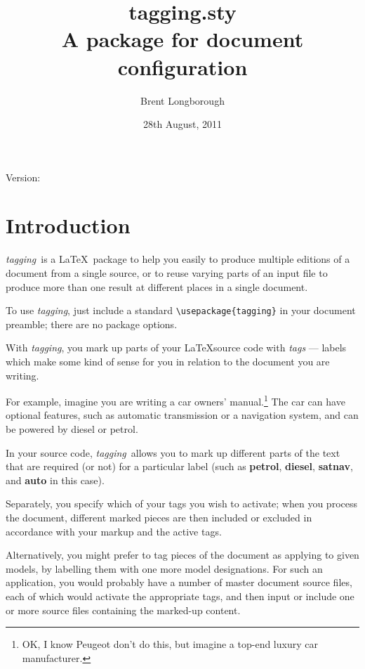\documentclass[a4paper,12pt,twoside,openany]{memoir}
\newcommand{\tpfname}{\textsf{tagging.sty}}
\newcommand{\tpname}{\textsf{\itshape tagging}}
\newcommand{\gitVtagn}{\space1.0}
\begin{document}
\title{%
	\Huge \tpfname\\[2ex]%
	\Large A package for document configuration
	}
\author{Brent Longborough}
\date{28th August, 2011}
\maketitle

{\centering
Version:\gitVtagn\\
}
\begingroup
{}
\setlength{\afterchapskip}{20pt}
\let\clearpage\relax
\let\chaptitlefont\Large\bfseries
\vspace*{5\baselineskip}
\tableofcontents*
\clearpage
\endgroup
\chapter{Introduction}
\tpname\ is a \LaTeX\ package to help you easily to
produce multiple editions of a document from a single source,
or to reuse varying parts of an input file
to produce more than one result at different places
in a single document.

To use \tpname, just include a standard \verb!\usepackage{tagging}!
in your document preamble; there are no package options.

With \tpname, you mark up parts of your
\LaTeX source code with \textit{tags} --- labels which
make some kind of sense for you in relation to
the document you are writing.

For example, imagine you are writing a car owners' manual.\footnote{%
OK, I know Peugeot don't do this,
but imagine a top-end luxury car manufacturer.}
The car can have optional features, such as automatic transmission
or a navigation system, and can be powered by diesel or petrol.

In your source code, \tpname\ allows you to
mark up different parts of the text that
are required (or not) for a particular label
(such as \textbf{petrol}, \textbf{diesel}, \textbf{satnav},
and \textbf{auto} in this case).

Separately, you specify which of your tags you wish to activate;
when you process the document, different marked pieces are then
included or excluded in accordance with your markup
and the active tags.

Alternatively, you might prefer to tag pieces of the document
as applying to given models, by labelling them with one more
model designations. 
For such an application, you would probably have
a number of master document source files,
each of which would activate the appropriate tags,
and then input or include one or more source files
containing the marked-up content.
\end{document}
